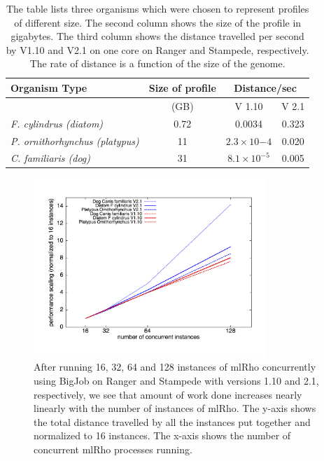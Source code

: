 \documentclass{sig-alternate}
\begin{document}
\begin{table}
\centering
\begin{tabular}{|p{3.3cm}|c| c |c  |     } \hline
{\scriptsize Organism Type	}	& {\scriptsize Size of profile}& \multicolumn{2}{|c|}{{\scriptsize Distance/sec} } \\ \hline
	& {\scriptsize (GB)}  & {\scriptsize V 1.10} & {\scriptsize V 2.1} \\ \hline
{\scriptsize {\it F. cylindrus (diatom)} } & {\scriptsize 0.72  }& {\scriptsize 0.0034} & {\scriptsize 0.323} \\ \hline
{\scriptsize {\it P. ornithorhynchus (platypus)} } & {\scriptsize 11 } &{\scriptsize $2.3{\times}10{-4}$ }&  {\scriptsize 0.020} \\ \hline
{\scriptsize {\it C. familiaris (dog)} } & {\scriptsize 31} & {\scriptsize $8.1{\times}10^{-5}$} & {\scriptsize 0.005} \\
\hline

\end{tabular}
\caption{The table lists three organisms which were chosen to represent profiles of different size. The second column shows the size of the profile in gigabytes. The third column shows the distance travelled per second by V1.10 and V2.1 on one core on Ranger and Stampede, respectively. The rate of distance is a function of the size of the genome.  } 
\label{table:cache_comp}
\end{table}


\begin{figure}[t] %
\centering
\includegraphics[width=0.78\textwidth]{figures/bj-scaling.png}
\caption{After running 16, 32, 64 and 128 instances of mlRho concurrently using BigJob on Ranger and Stampede with versions 1.10 and 2.1, respectively, we see that amount of work done increases nearly linearly with the number of instances of mlRho. The y-axis shows the total distance travelled by all the instances put together and normalized to 16 instances. The x-axis shows the number of concurrent mlRho processes running. }
\label{fig:bj-scaling}
\end{figure}
\end{document}
